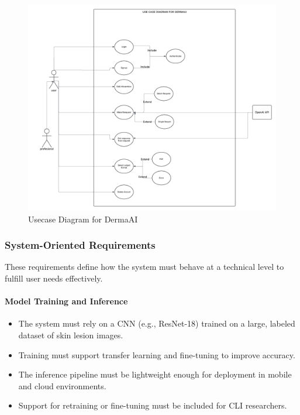 \documentclass[
  12pt,
  oneside]{article}
\providecommand{\tightlist}{%
  \setlength{\itemsep}{0pt}\setlength{\parskip}{0pt}}
\begin{document}
\begin{figure}

{\centering \includegraphics[width=1\linewidth]{DermaAI-Usecase} 

}

\caption{Usecase Diagram for DermaAI}\label{fig:unnamed-chunk-14}
\end{figure}

\subsubsection{System-Oriented
Requirements}\label{system-oriented-requirements}

These requirements define how the system must behave at a technical
level to fulfill user needs effectively.

\paragraph{Model Training and
Inference}\label{model-training-and-inference}

\begin{itemize}
\tightlist
\item
  The system must rely on a CNN (e.g., ResNet-18) trained on a large,
  labeled dataset of skin lesion images.\\
\item
  Training must support transfer learning and fine-tuning to improve
  accuracy.\\
\item
  The inference pipeline must be lightweight enough for deployment in
  mobile and cloud environments.\\
\item
  Support for retraining or fine-tuning must be included for CLI
  researchers.
\end{itemize}
\end{document}
